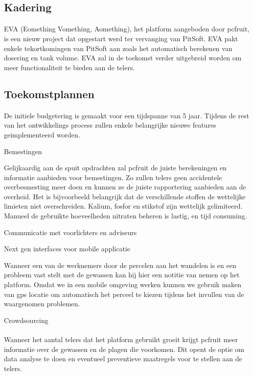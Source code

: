 \subsection {Kadering}

\paragraph {} EVA (Eomething Vomething, Aomething), het platform aangeboden door pcfruit,
is een nieuw project dat opgestart werd ter vervanging van PitSoft. EVA pakt enkele
tekortkomingen van PitSoft aan zoals het automatisch berekenen van dosering en tank
volume. EVA zal in de toekomst verder uitgebreid worden om meer functionaliteit te bieden
aan de telers.

\subsection {Toekomstplannen}

\paragraph {} De initiele budgetering is gemaakt voor een tijdspanne van 5 jaar. Tijdens de rest van
het ontwikkelings process zullen enkele belangrijke nieuwe features geimplementeerd
worden.

Bemestingen

Gelijkaardig aan de spuit opdrachten zal pcfruit de juiste berekeningen en informatie
aanbieden voor bemestingen. Zo zullen telers geen accidentele overbesmesting meer doen en
kunnen ze de juiste rapportering aanbieden aan de overheid. Het is bijvoorbeeld
belangrijk dat de verschillende stoffen de wettelijke limieten niet overschreiden.
Kalium, fosfor en stikstof zijn wettelijk gelimiteerd. Manueel de gebruikte hoeveelheden
nitraten beheren is lastig, en tijd consuming.

Communicatie met voorlichters en adviseurs

Next gen interfaces voor mobile applicatie

Wanneer een van de werknemers door de percelen aan het wandelen is en een probleem vast
stelt met de gewassen kan hij hier een notitie van nemen op het platform. Omdat we in een
mobile omgeving werken kunnen we gebruik maken van gps locatie om automatisch het perceel
te kiezen tijdens het invullen van de waargenomen problemen.

Crowdsourcing

\paragraph {} Wanneer het aantal telers dat het platform gebruikt groeit krijgt pcfruit
meer informatie over de gewassen en de plagen die voorkomen. Dit opent de optie om data
analyse te doen en eventueel preventieve maatregels voor te stellen aan de telers.


